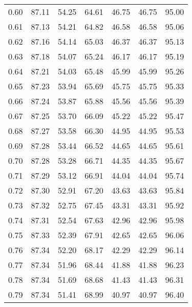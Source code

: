 \begin{tabular}{|c|c|c|c|c|c|c|}
      0.60 &     87.11 &     54.25 &      64.61 &   46.75 &      46.75 &         95.00 \\
      0.61 &     87.13 &     54.21 &      64.82 &   46.58 &      46.58 &         95.06 \\
      0.62 &     87.16 &     54.14 &      65.03 &   46.37 &      46.37 &         95.13 \\
      0.63 &     87.18 &     54.07 &      65.24 &   46.17 &      46.17 &         95.19 \\
      0.64 &     87.21 &     54.03 &      65.48 &   45.99 &      45.99 &         95.26 \\
      0.65 &     87.23 &     53.94 &      65.69 &   45.75 &      45.75 &         95.33 \\
      0.66 &     87.24 &     53.87 &      65.88 &   45.56 &      45.56 &         95.39 \\
      0.67 &     87.25 &     53.70 &      66.09 &   45.22 &      45.22 &         95.47 \\
      0.68 &     87.27 &     53.58 &      66.30 &   44.95 &      44.95 &         95.53 \\
      0.69 &     87.28 &     53.44 &      66.52 &   44.65 &      44.65 &         95.61 \\
      0.70 &     87.28 &     53.28 &      66.71 &   44.35 &      44.35 &         95.67 \\
      0.71 &     87.29 &     53.12 &      66.91 &   44.04 &      44.04 &         95.74 \\
      0.72 &     87.30 &     52.91 &      67.20 &   43.63 &      43.63 &         95.84 \\
      0.73 &     87.32 &     52.75 &      67.45 &   43.31 &      43.31 &         95.92 \\
      0.74 &     87.31 &     52.54 &      67.63 &   42.96 &      42.96 &         95.98 \\
      0.75 &     87.33 &     52.39 &      67.91 &   42.65 &      42.65 &         96.06 \\
      0.76 &     87.34 &     52.20 &      68.17 &   42.29 &      42.29 &         96.14 \\
      0.77 &     87.34 &     51.96 &      68.44 &   41.88 &      41.88 &         96.23 \\
      0.78 &     87.34 &     51.69 &      68.68 &   41.43 &      41.43 &         96.31 \\
      0.79 &     87.34 &     51.41 &      68.99 &   40.97 &      40.97 &         96.40 \\

\end{tabular}
